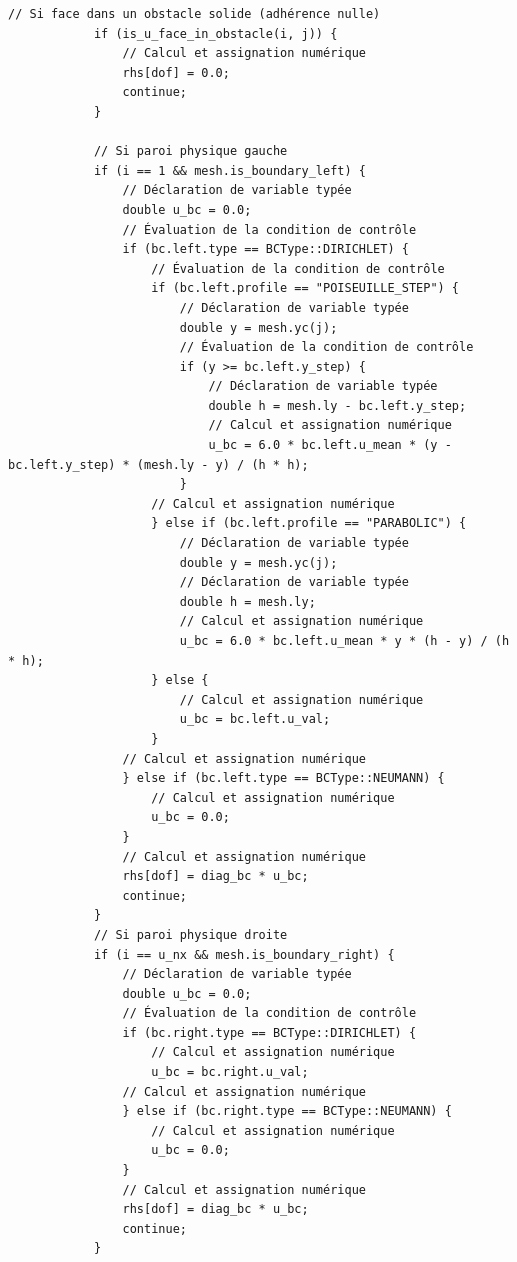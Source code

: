 \documentclass[10pt,a4paper,oneside]{book}
\begin{document}
\begin{lstlisting}[language={[11]C++}]
            // Si face dans un obstacle solide (adhérence nulle)
            if (is_u_face_in_obstacle(i, j)) {
                // Calcul et assignation numérique
                rhs[dof] = 0.0;
                continue;
            }

            // Si paroi physique gauche
            if (i == 1 && mesh.is_boundary_left) {
                // Déclaration de variable typée
                double u_bc = 0.0;
                // Évaluation de la condition de contrôle
                if (bc.left.type == BCType::DIRICHLET) {
                    // Évaluation de la condition de contrôle
                    if (bc.left.profile == "POISEUILLE_STEP") {
                        // Déclaration de variable typée
                        double y = mesh.yc(j);
                        // Évaluation de la condition de contrôle
                        if (y >= bc.left.y_step) {
                            // Déclaration de variable typée
                            double h = mesh.ly - bc.left.y_step;
                            // Calcul et assignation numérique
                            u_bc = 6.0 * bc.left.u_mean * (y - bc.left.y_step) * (mesh.ly - y) / (h * h);
                        }
                    // Calcul et assignation numérique
                    } else if (bc.left.profile == "PARABOLIC") {
                        // Déclaration de variable typée
                        double y = mesh.yc(j);
                        // Déclaration de variable typée
                        double h = mesh.ly;
                        // Calcul et assignation numérique
                        u_bc = 6.0 * bc.left.u_mean * y * (h - y) / (h * h);
                    } else {
                        // Calcul et assignation numérique
                        u_bc = bc.left.u_val;
                    }
                // Calcul et assignation numérique
                } else if (bc.left.type == BCType::NEUMANN) {
                    // Calcul et assignation numérique
                    u_bc = 0.0;
                }
                // Calcul et assignation numérique
                rhs[dof] = diag_bc * u_bc;
                continue;
            }
            // Si paroi physique droite
            if (i == u_nx && mesh.is_boundary_right) {
                // Déclaration de variable typée
                double u_bc = 0.0;
                // Évaluation de la condition de contrôle
                if (bc.right.type == BCType::DIRICHLET) {
                    // Calcul et assignation numérique
                    u_bc = bc.right.u_val;
                // Calcul et assignation numérique
                } else if (bc.right.type == BCType::NEUMANN) {
                    // Calcul et assignation numérique
                    u_bc = 0.0;
                }
                // Calcul et assignation numérique
                rhs[dof] = diag_bc * u_bc;
                continue;
            }


\end{lstlisting}
\end{document}
